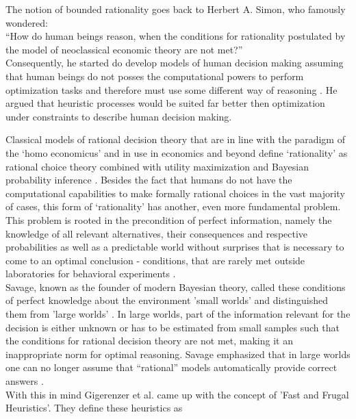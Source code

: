 
The notion of bounded rationality goes back to Herbert A. Simon, who famously wondered: \\

``How do human beings reason, when the conditions for rationality postulated by the model of neoclassical economic theory are not met?''  \citep{simon1989scientist}\\

Consequently, he started do develop models of human decision making assuming that human beings do not posses the computational powers to perform optimization tasks and therefore must use some different way of reasoning \cite{simon1982models}. He argued that heuristic processes would be suited far better then optimization under constraints to describe human decision making.
 
Classical models of rational decision theory that are in line with the paradigm of the `homo economicus' and in use in economics and beyond define `rationality' as rational choice theory combined with utility maximization and Bayesian probability inference \citep{wilkinson2012introduction}.
Besides the fact that humans do not have the computational capabilities to make formally rational choices in the vast majority of cases, this form of `rationality' has another, even more fundamental problem. This problem is rooted in the precondition of perfect information, namely the knowledge of all relevant alternatives, their consequences and respective probabilities as well as a predictable world without surprises that is necessary to come to an optimal conclusion - conditions, that are rarely met outside laboratories for behavioral experiments \citep{Gigerenzer2011}.\\
Savage, known as the founder of modern Bayesian theory, called these conditions of perfect knowledge about the environment 'small worlds' and distinguished them from 'large worlds' \citep{savage1972foundations}. In large worlds, part of the information relevant for the decision is either unknown or has to be estimated from small samples such that the conditions for rational decision theory are not met, making it an inappropriate norm for optimal reasoning. Savage emphasized that in large worlds one can no longer assume that ``rational'' models automatically provide correct answers \citep{binmore2008rational}.\\
With this in mind Gigerenzer et al. came up with the concept of 'Fast and Frugal Heuristics'. They define these heuristics as
\\

